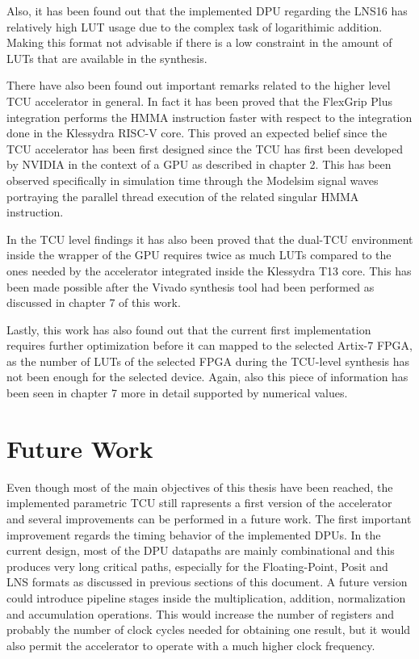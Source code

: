 Also, it has been found out that the implemented DPU regarding the LNS16 has relatively high LUT usage due to the complex task of logarithimic addition. Making this format not advisable if there is a low constraint in the amount of LUTs that are available in the synthesis. 

There have also been found out important remarks related to the higher level TCU accelerator in general. In fact it has been proved that the FlexGrip Plus integration performs the HMMA instruction faster with respect to the integration done in the Klessydra RISC-V core. This proved an expected belief since the TCU accelerator has been first designed since the TCU has first been developed by NVIDIA in the context of a GPU as described in chapter 2. This has been observed specifically in simulation time through the Modelsim signal waves portraying the parallel thread execution of the related singular HMMA instruction.

In the TCU level findings it has also been proved that the dual-TCU environment inside the wrapper of the GPU requires twice as much LUTs compared to the ones needed by the accelerator integrated inside the Klessydra T13 core. This has been made possible after the Vivado synthesis tool had been performed as discussed in chapter 7 of this work.

Lastly, this work has also found out that the current first implementation requires further optimization before it can mapped to the selected Artix-7 FPGA, as the number of LUTs of the selected FPGA during the TCU-level synthesis has not been enough for the selected device. Again, also this piece of information has been seen in chapter 7 more in detail supported by numerical values.

\newpage
\section{Future Work}

Even though most of the main objectives of this thesis have been reached, the
implemented parametric TCU still rapresents a first version of the
accelerator and several improvements can be performed in a future work.
The first important improvement regards the timing behavior of the
implemented DPUs. In the current design, most of the DPU datapaths are
mainly combinational and this produces very long critical paths,
especially for the Floating-Point, Posit and LNS formats as discussed in previous sections of this document. A future
version could introduce pipeline stages inside the multiplication,
addition, normalization and accumulation operations. This would
increase the number of registers and probably the number of clock
cycles needed for obtaining one result, but it would also permit the
accelerator to operate with a much higher clock frequency.

